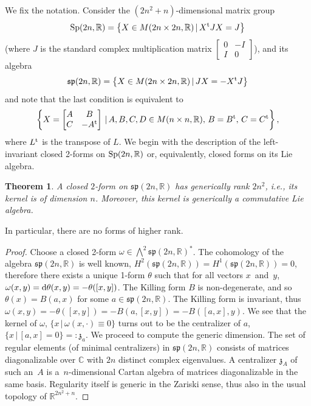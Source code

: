 \documentclass[10pt,a4paper]{amsart}
\numberwithin{equation}{section}
\newtheorem{Theorem}{Theorem}[section]
{ \theoremstyle{definition}
\newtheorem{Definition}[Theorem]{Definition}
\newtheorem{Example}[Theorem]{Example}
\newtheorem{Remark}[Theorem]{Remark} }
\begin{document}
We fix the notation. Consider the $(2n^2+n)$-dimensional matrix group
\begin{gather*}
{\rm Sp}(2n,\mathbb{R})=\big\{X\in M(2n\times 2n,\mathbb{R})\,|\,X^{\rm t}JX=J\big\}
\end{gather*}
(where $J$ is the standard complex multiplication matrix $\left[\begin{smallmatrix} 0&-I\\ I&0 \end{smallmatrix}\right]$), and its algebra
\begin{gather*}
\mathfrak{sp}(2n,\mathbb{R})=\big\{X\in M(2n\times 2n,\mathbb{R})\,|\,JX=-X^{\rm t}J\big\}
\end{gather*}
and note that the last condition is equivalent to
\begin{gather}
\left\{X=\left[
\begin{matrix}
A & B\\
C & -A^{\rm t}
\end{matrix}
\right]\,|\,A,B,C,D\in M(n\times n,\mathbb{R}),\,B=B^{\rm t},\,C=C^{\rm t}\right\}, \label{(ast)}
\end{gather}
where $L^{\rm t}$ is the transpose of $L$. We begin with the description of the left-invariant closed 2-forms on ${\rm Sp}(2n,\mathbb{R})$ or, equivalently, closed forms on its Lie algebra.
\begin{Theorem}
A closed $2$-form on $\mathfrak{sp}(2n,\mathbb{R})$ has generically rank $2n^2$, i.e., its kernel is of dimension $n$. Moreover, this kernel is generically a commutative Lie algebra.
\end{Theorem}
In particular, there are no forms of higher rank.
\begin{proof}
Choose a closed 2-form $\omega\in\bigwedge^2\mathfrak{sp}(2n,\mathbb{R})^*$. The cohomology of the algebra $\mathfrak{sp}(2n,\mathbb{R})$ is well known, $H^2(\mathfrak{sp}(2n,\mathbb{R})) = H^1(\mathfrak{sp}(2n,\mathbb{R})) = 0$, therefore there exists a unique 1-form $\theta$ such that for all vectors $x$~and~$y$, $\omega(x,y)={\rm d}\theta(x,y)=-\theta([x,y])$. The Killing form $B$ is non-degenerate, and so $\theta(x)=B(a,x)$ for some $a\in\mathfrak{sp}(2n,\mathbb{R})$. The Killing form is invariant, thus $\omega(x,y)=-\theta([x,y])=-B(a,[x,y])=-B([a,x],y)$. We see that the kernel of $\omega$, $\{x\,|\,\omega(x,\cdot)\equiv 0\}$ turns out to be the centralizer of $a$, $\{x\,|\,[a,x]=0\}=:\mathfrak{z}_a$.
We proceed to compute the generic dimension. The set of regular elements (of minimal centralizers) in $\mathfrak{sp}(2n,\mathbb{R})$ consists of matrices diagonalizable over $\mathbb{C}$ with $2n$ distinct complex eigenvalues. A centralizer $\mathfrak{z}_A$ of such an~$A$ is a~$n$-dimensional Cartan algebra of matrices diagonalizable in the same basis. Regularity itself is generic in the Zariski sense, thus also in the usual topology of $\mathbb{R}^{2n^2+n}$.
\end{proof}
\end{document}
